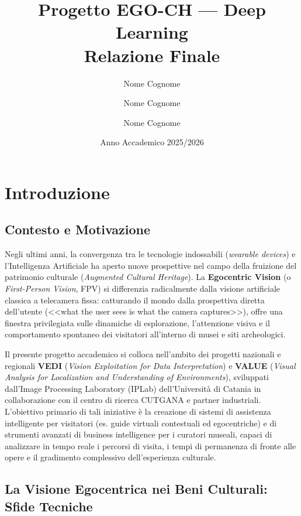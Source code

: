 \documentclass[a4paper,12pt]{report}
\title{Progetto EGO-CH --- Deep Learning\\
\large Relazione Finale}
\author{Nome Cognome \and Nome Cognome \and Nome Cognome}
\date{Anno Accademico 2025/2026}
\begin{document}
\maketitle
\tableofcontents
\newpage

\chapter{Introduzione}

\section{Contesto e Motivazione}

Negli ultimi anni, la convergenza tra le tecnologie indossabili (\emph{wearable devices}) e l'Intelligenza Artificiale ha aperto nuove prospettive nel campo della fruizione del patrimonio culturale (\emph{Augmented Cultural Heritage}). La \textbf{Egocentric Vision} (o \emph{First-Person Vision}, FPV) si differenzia radicalmente dalla visione artificiale classica a telecamera fissa: catturando il mondo dalla prospettiva diretta dell'utente (<<what the user sees is what the camera captures>>), offre una finestra privilegiata sulle dinamiche di esplorazione, l'attenzione visiva e il comportamento spontaneo dei visitatori all'interno di musei e siti archeologici.

Il presente progetto accademico si colloca nell'ambito dei progetti nazionali e regionali \textbf{VEDI} (\emph{Vision Exploitation for Data Interpretation}) e \textbf{VALUE} (\emph{Visual Analysis for Localization and Understanding of Environments}), sviluppati dall'Image Processing Laboratory (IPLab) dell'Università di Catania in collaborazione con il centro di ricerca CUTGANA e partner industriali. L'obiettivo primario di tali iniziative è la creazione di sistemi di assistenza intelligente per visitatori (es. guide virtuali contestuali ed egocentriche) e di strumenti avanzati di business intelligence per i curatori museali, capaci di analizzare in tempo reale i percorsi di visita, i tempi di permanenza di fronte alle opere e il gradimento complessivo dell'esperienza culturale.

\section{La Visione Egocentrica nei Beni Culturali: Sfide Tecniche}
\end{document}
